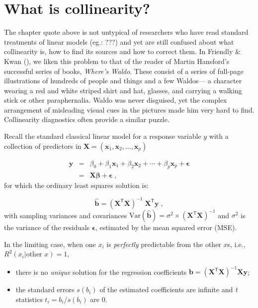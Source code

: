 \documentclass[
  letterpaper,
  10pt,
  krantz2]{krantz}
\providecommand{\tightlist}{%
  \setlength{\itemsep}{0pt}\setlength{\parskip}{0pt}}\usepackage{longtable,booktabs,array}
\begin{document}
{\section{What is collinearity?}\label{what-is-collinearity}

The chapter quote above is not untypical of researchers who have read
standard treatments of linear models (eg.: ???) and yet are still
confused about what collinearity is, how to find its sources and how to
correct them. In Friendly \& Kwan
(), we liken this problem to that
of the reader of Martin Hansford's successful series of books,
\emph{Where's Waldo}. These consist of a series of full-page
illustrations of hundreds of people and things and a few Waldos--- a
character wearing a red and white striped shirt and hat, glasses, and
carrying a walking stick or other paraphernalia. Waldo was never
disguised, yet the complex arrangement of misleading visual cues in the
pictures made him very hard to find. Collinearity diagnostics often
provide a similar puzzle.

Recall the standard classical linear model for a response variable \(y\)
with a collection of predictors in
\(\mathbf{X} = (\mathbf{x}_1, \mathbf{x}_2, ..., \mathbf{x}_p)\)

\begin{eqnarray*}
\mathbf{y} & =&  \beta_0 + \beta_1 \mathbf{x}_1 + \beta_2 \mathbf{x}_2 + \cdots + \beta_p \mathbf{x}_p + \mathbf{\epsilon} \\
         & = & \mathbf{X} \mathbf{\beta} + \mathbf{\epsilon} \; ,
\end{eqnarray*} for which the ordinary least squares solution is:

\[
\widehat{\mathbf{b}} = (\mathbf{X}^\textsf{T} \mathbf{X})^{-1} \; \mathbf{X}^\textsf{T} \mathbf{y} \; ,
\] with sampling variances and covariances
\(\text{Var} (\widehat{\mathbf{b}}) = \sigma^2 \times (\mathbf{X}^\textsf{T} \mathbf{X})^{-1}\)
and \(\sigma^2\) is the variance of the residuals \(\mathbf{\epsilon}\),
estimated by the mean squared error (MSE).

In the limiting case, when one \(x_i\) is \emph{perfectly} predictable
from the other \(x\)s, i.e., \(R^2 (x_i | \text{other }x) = 1\),

\begin{itemize}
\tightlist
\item
  there is no \emph{unique} solution for the regression coefficients
  \(\mathbf{b} = (\mathbf{X}^\textsf{T} \mathbf{X})^{-1} \mathbf{X} \mathbf{y}\);
\item
  the standard errors \(s (b_i)\) of the estimated coefficients are
  infinite and \emph{t} statistics \(t_i = b_i / s (b_i)\) are 0.
\end{itemize}

}
\end{document}
